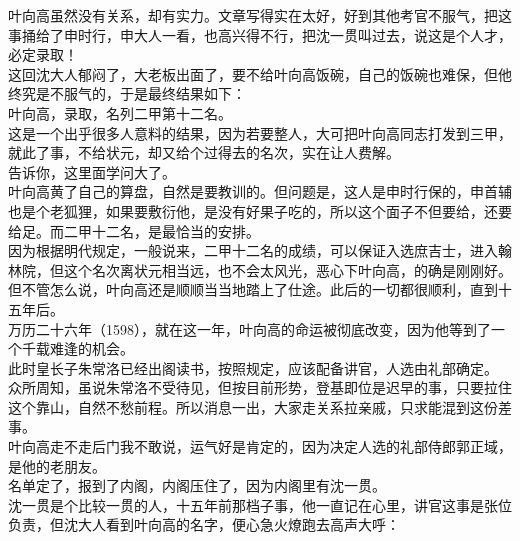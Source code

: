 \begin{multicols}{\theparacolNo}
叶向高虽然没有关系，却有实力。文章写得实在太好，好到其他考官不服气，把这事捅给了申时行，申大人一看，也高兴得不行，把沈一贯叫过去，说这是个人才，必定录取！\\

这回沈大人郁闷了，大老板出面了，要不给叶向高饭碗，自己的饭碗也难保，但他终究是不服气的，于是最终结果如下：\\

叶向高，录取，名列二甲第十二名。\\

这是一个出乎很多人意料的结果，因为若要整人，大可把叶向高同志打发到三甲，就此了事，不给状元，却又给个过得去的名次，实在让人费解。\\

告诉你，这里面学问大了。\\

叶向高黄了自己的算盘，自然是要教训的。但问题是，这人是申时行保的，申首辅也是个老狐狸，如果要敷衍他，是没有好果子吃的，所以这个面子不但要给，还要给足。而二甲十二名，是最恰当的安排。\\

因为根据明代规定，一般说来，二甲十二名的成绩，可以保证入选庶吉士，进入翰林院，但这个名次离状元相当远，也不会太风光，恶心下叶向高，的确是刚刚好。\\

但不管怎么说，叶向高还是顺顺当当地踏上了仕途。此后的一切都很顺利，直到十五年后。\\

万历二十六年（1598），就在这一年，叶向高的命运被彻底改变，因为他等到了一个千载难逢的机会。\\

此时皇长子朱常洛已经出阁读书，按照规定，应该配备讲官，人选由礼部确定。\\

众所周知，虽说朱常洛不受待见，但按目前形势，登基即位是迟早的事，只要拉住这个靠山，自然不愁前程。所以消息一出，大家走关系拉亲戚，只求能混到这份差事。\\

叶向高走不走后门我不敢说，运气好是肯定的，因为决定人选的礼部侍郎郭正域，是他的老朋友。\\

名单定了，报到了内阁，内阁压住了，因为内阁里有沈一贯。\\

沈一贯是个比较一贯的人，十五年前那档子事，他一直记在心里，讲官这事是张位负责，但沈大人看到叶向高的名字，便心急火燎跑去高声大呼：\\


\end{multicols}
